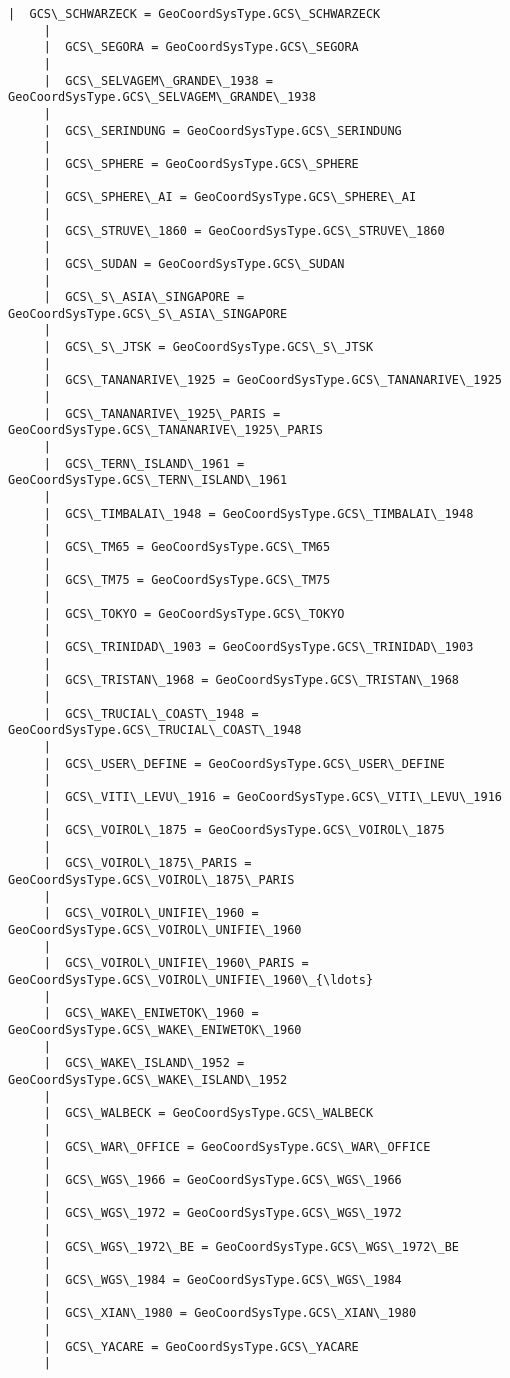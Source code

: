 \documentclass[11pt]{article}
\begin{document}
\begin{Verbatim}[commandchars=\\\{\}]
     |  GCS\_SCHWARZECK = GeoCoordSysType.GCS\_SCHWARZECK
     |  
     |  GCS\_SEGORA = GeoCoordSysType.GCS\_SEGORA
     |  
     |  GCS\_SELVAGEM\_GRANDE\_1938 = GeoCoordSysType.GCS\_SELVAGEM\_GRANDE\_1938
     |  
     |  GCS\_SERINDUNG = GeoCoordSysType.GCS\_SERINDUNG
     |  
     |  GCS\_SPHERE = GeoCoordSysType.GCS\_SPHERE
     |  
     |  GCS\_SPHERE\_AI = GeoCoordSysType.GCS\_SPHERE\_AI
     |  
     |  GCS\_STRUVE\_1860 = GeoCoordSysType.GCS\_STRUVE\_1860
     |  
     |  GCS\_SUDAN = GeoCoordSysType.GCS\_SUDAN
     |  
     |  GCS\_S\_ASIA\_SINGAPORE = GeoCoordSysType.GCS\_S\_ASIA\_SINGAPORE
     |  
     |  GCS\_S\_JTSK = GeoCoordSysType.GCS\_S\_JTSK
     |  
     |  GCS\_TANANARIVE\_1925 = GeoCoordSysType.GCS\_TANANARIVE\_1925
     |  
     |  GCS\_TANANARIVE\_1925\_PARIS = GeoCoordSysType.GCS\_TANANARIVE\_1925\_PARIS
     |  
     |  GCS\_TERN\_ISLAND\_1961 = GeoCoordSysType.GCS\_TERN\_ISLAND\_1961
     |  
     |  GCS\_TIMBALAI\_1948 = GeoCoordSysType.GCS\_TIMBALAI\_1948
     |  
     |  GCS\_TM65 = GeoCoordSysType.GCS\_TM65
     |  
     |  GCS\_TM75 = GeoCoordSysType.GCS\_TM75
     |  
     |  GCS\_TOKYO = GeoCoordSysType.GCS\_TOKYO
     |  
     |  GCS\_TRINIDAD\_1903 = GeoCoordSysType.GCS\_TRINIDAD\_1903
     |  
     |  GCS\_TRISTAN\_1968 = GeoCoordSysType.GCS\_TRISTAN\_1968
     |  
     |  GCS\_TRUCIAL\_COAST\_1948 = GeoCoordSysType.GCS\_TRUCIAL\_COAST\_1948
     |  
     |  GCS\_USER\_DEFINE = GeoCoordSysType.GCS\_USER\_DEFINE
     |  
     |  GCS\_VITI\_LEVU\_1916 = GeoCoordSysType.GCS\_VITI\_LEVU\_1916
     |  
     |  GCS\_VOIROL\_1875 = GeoCoordSysType.GCS\_VOIROL\_1875
     |  
     |  GCS\_VOIROL\_1875\_PARIS = GeoCoordSysType.GCS\_VOIROL\_1875\_PARIS
     |  
     |  GCS\_VOIROL\_UNIFIE\_1960 = GeoCoordSysType.GCS\_VOIROL\_UNIFIE\_1960
     |  
     |  GCS\_VOIROL\_UNIFIE\_1960\_PARIS = GeoCoordSysType.GCS\_VOIROL\_UNIFIE\_1960\_{\ldots}
     |  
     |  GCS\_WAKE\_ENIWETOK\_1960 = GeoCoordSysType.GCS\_WAKE\_ENIWETOK\_1960
     |  
     |  GCS\_WAKE\_ISLAND\_1952 = GeoCoordSysType.GCS\_WAKE\_ISLAND\_1952
     |  
     |  GCS\_WALBECK = GeoCoordSysType.GCS\_WALBECK
     |  
     |  GCS\_WAR\_OFFICE = GeoCoordSysType.GCS\_WAR\_OFFICE
     |  
     |  GCS\_WGS\_1966 = GeoCoordSysType.GCS\_WGS\_1966
     |  
     |  GCS\_WGS\_1972 = GeoCoordSysType.GCS\_WGS\_1972
     |  
     |  GCS\_WGS\_1972\_BE = GeoCoordSysType.GCS\_WGS\_1972\_BE
     |  
     |  GCS\_WGS\_1984 = GeoCoordSysType.GCS\_WGS\_1984
     |  
     |  GCS\_XIAN\_1980 = GeoCoordSysType.GCS\_XIAN\_1980
     |  
     |  GCS\_YACARE = GeoCoordSysType.GCS\_YACARE
     |  

\end{Verbatim}
\end{document}
